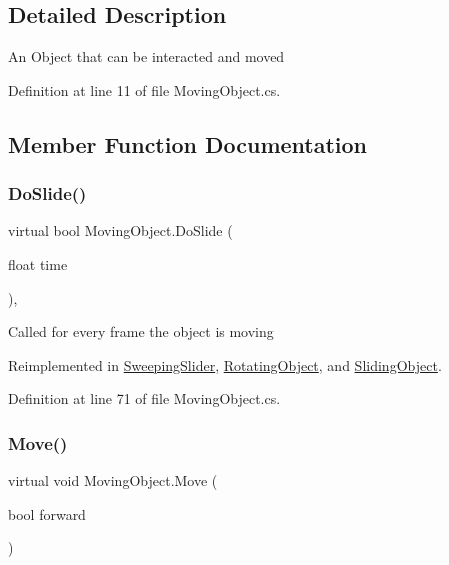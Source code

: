 \subsection{Detailed Description}
An Object that can be interacted and moved 



Definition at line 11 of file Moving\+Object.\+cs.



\subsection{Member Function Documentation}
\mbox{\label{class_moving_object_a3ee062f4d319649a0006bc58a9d7a620}} 
\subsubsection{\texorpdfstring{Do\+Slide()}{DoSlide()}}
{\footnotesize\ttfamily virtual bool Moving\+Object.\+Do\+Slide (\begin{DoxyParamCaption}\item[{float}]{time }\end{DoxyParamCaption})\hspace{0.3cm}{\ttfamily [protected]}, {\ttfamily [virtual]}}



Called for every frame the object is moving 



Reimplemented in \mbox{\hyperlink{class_sweeping_slider_ac2a74d4cc8483404f577f51aef02589e}{Sweeping\+Slider}}, \mbox{\hyperlink{class_rotating_object_ac1d4caba5c9e39d48195c8b1bc1eb9d0}{Rotating\+Object}}, and \mbox{\hyperlink{class_sliding_object_a5da98cd763d752b6a7378d181b35f3d0}{Sliding\+Object}}.



Definition at line 71 of file Moving\+Object.\+cs.

\mbox{\label{class_moving_object_a13f0299fb3749abeb0eb0ed4fd583036}} 
\subsubsection{\texorpdfstring{Move()}{Move()}\hspace{0.1cm}{\footnotesize\ttfamily [1/2]}}
{\footnotesize\ttfamily virtual void Moving\+Object.\+Move (\begin{DoxyParamCaption}\item[{bool}]{forward }\end{DoxyParamCaption})\hspace{0.3cm}{\ttfamily [virtual]}}



